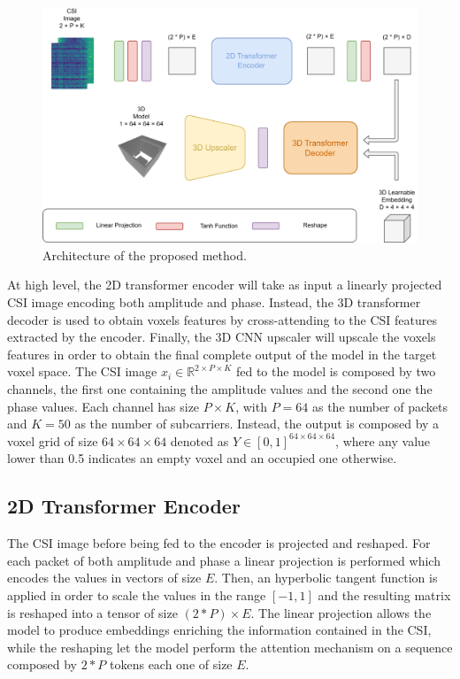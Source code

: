 \documentclass[binding=0.6cm,noexaminfo]{sapthesis}
\begin{document}
\begin{figure}[h!]
\centering
\includegraphics[width=\linewidth]{arch}
\caption{Architecture of the proposed method.}
\label{fig:arch}
\end{figure}

At high level, the 2D transformer encoder will take as input a linearly projected CSI image encoding both amplitude and phase. Instead, the 3D transformer decoder is used to obtain voxels features by cross-attending to the CSI features extracted by the encoder. Finally, the 3D CNN upscaler will upscale the voxels features in order to obtain the final complete output of the model in the target voxel space.
The CSI image $x_i \in \mathbb{R}^{2 \times P \times K}$ fed to the model is composed by two channels, the first one containing the amplitude values and the second one the phase values. Each channel has size $P \times K$, with $P = 64$ as the number of packets and $K = 50$ as the number of subcarriers. Instead, the output is composed by a voxel grid of size $64 \times 64 \times 64$ denoted as $Y \in [0,1]^{64 \times 64 \times 64}$, where any value lower than 0.5 indicates an empty voxel and an occupied one otherwise.


\subsection{2D Transformer Encoder}

The CSI image before being fed to the encoder is projected and reshaped. For each packet of both amplitude and phase a linear projection is performed which encodes the values in vectors of size $E$. Then, an hyperbolic tangent function is applied in order to scale the values in the range $[-1,1]$ and the resulting matrix is reshaped into a tensor of size $(2 * P) \times E$. The linear projection allows the model to produce embeddings enriching the information contained in the CSI, while the reshaping let the model perform the attention mechanism on a sequence composed by $2 * P$ tokens each one of size $E$.
\end{document}
